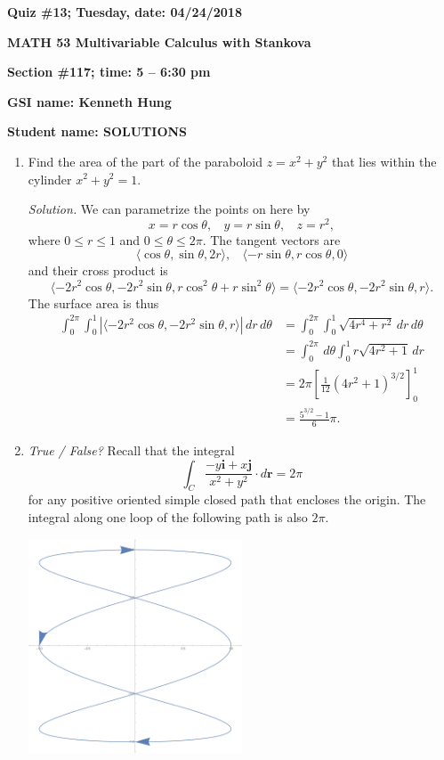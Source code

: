 \documentclass{article}
\newcommand{\rr}{\mathbf{r}}
\newcommand{\ii}{\mathbf{i}}
\newcommand{\jj}{\mathbf{j}}
\begin{document}
{\bf Quiz \#13; Tuesday, date: 04/24/2018}

{\bf MATH 53 Multivariable Calculus with Stankova}

{\bf Section \#117; time: 5 -- 6:30 pm}

{\bf GSI name: Kenneth Hung}

{\bf Student name: SOLUTIONS}

\vspace*{0.25in}

\begin{enumerate}
\item Find the area of the part of the paraboloid $z = x^2 + y^2$ that lies within the cylinder $x^2 + y^2 = 1$.

{\em Solution.} We can parametrize the points on here by
\[
x = r \cos \theta, ~~~~ y = r \sin \theta, ~~~~ z = r^2,
\]
where $0 \le r \le 1$ and $0 \le \theta \le 2\pi$. The tangent vectors are
\[
\langle \cos \theta, \sin \theta, 2r \rangle, ~~~~ \langle -r \sin \theta, r \cos \theta, 0 \rangle
\]
and their cross product is
\[
\langle -2r^2 \cos \theta, -2r^2 \sin \theta, r \cos^2 \theta + r \sin^2 \theta\rangle = \langle -2r^2 \cos \theta, -2r^2 \sin \theta, r \rangle.
\]
The surface area is thus
\begin{align*}
\int_0^{2\pi} \int_0^1 \left|\langle -2r^2 \cos \theta, -2r^2 \sin \theta, r \rangle\right| \,dr \,d\theta & = \int_0^{2\pi} \int_0^1 \sqrt{4 r^4 + r^2} \,dr \,d\theta \\
& = \int_0^{2\pi} \,d\theta \int_0^1 r \sqrt{4 r^2 + 1} \,dr \\
& = 2\pi \left[\frac{1}{12} (4r^2 + 1)^{3/2}\right]_0^1 \\
& = \frac{5^{3/2} - 1}{6} \pi.
\end{align*}

\item {\em True / False?} Recall that the integral
\[
\int_C \frac{-y \ii + x \jj}{x^2 + y^2} \cdot d\rr = 2\pi
\]
for any positive oriented simple closed path that encloses the origin. The integral along one loop of the following path is also $2\pi$.
\begin{center}
\includegraphics[width=0.5\textwidth]{quiz13dis117pic}
\end{center}


\end{enumerate}
\end{document}

